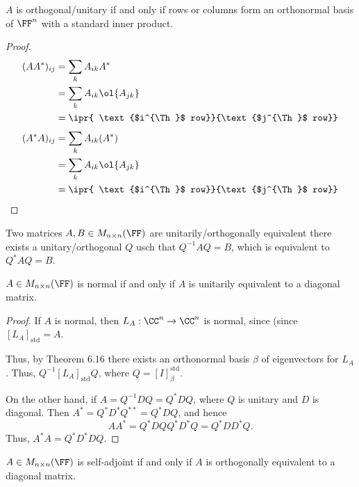 \documentclass[11pt]{scrartcl}
\begin{document}
  \begin{remark}
    $A$ is orthogonal/unitary if and only if rows or columns form an orthonormal basis of $\FF^n$ with a standard inner product.
  \end{remark}
  \begin{proof}
    \hfill

    \begin{align}
      (AA^{*})_{ij} & = \sum_k A_{ik}A^{*}        \\
                    & = \sum_{k} A_{ik}\ol{A_{jk}} \\
                    & = \ipr{ \text{$i^{\Th}$ row}}{\text{$j^{\Th}$ row}}
    \end{align}
    \begin{align}
      (A^* A)_{ij} & = \sum_kA_{ik}(A^{*})        \\
                    & = \sum_{k} A_{ik}\ol{A_{jk}} \\
                    & = \ipr{ \text{$i^{\Th}$ row}}{\text{$j^{\Th}$ row}}
    \end{align}
  \end{proof}
  \begin{definition}
    Two matrices $A, B \in M_{n\times n}(\FF)$ are unitarily/orthogonally equivalent there exists a unitary/orthogonal $Q$ usch that $Q^{-1}AQ = B$, which is equivalent to $Q^{*}AQ = B$.
  \end{definition}
  \begin{theorem}
    $A \in M_{n\times n}(\FF)$ is normal if and only if $A$ is unitarily equivalent to a diagonal matrix.
  \end{theorem}

  \begin{proof}
    \hfill

    If $A$ is normal, then $L_A:\CC^n\to\CC^n$ is normal, since (since $[L_A]_{\text{std}}=A$.

    Thus, by Theorem 6.16 there exists an orthonormal basis $\beta$ of eigenvectors for $L_{A}$. Thus, $Q^{-1}[L_A]_{\text{std}}Q$, where $Q=[I]_{\beta}^{\text{std}}$.

    On the other hand, if $A = Q^{-1}DQ=Q^{*}DQ$, where $Q$ is unitary and $D$ is diagonal. Then $A^{*}=Q^{*}D^{*}Q^{**}=Q^{*}DQ$, and hence \[AA^{*} = Q^{*}DQQ^{*}D^{*}Q = Q^{*}DD^{*}Q.\]
    Thus,  $A^{*}A = Q^{*}D^{*}DQ$.
  \end{proof}

  \begin{theorem}
    $A \in M_{n\times n}(\FF)$ is self-adjoint if and only if $A$ is orthogonally equivalent to a diagonal matrix.
  \end{theorem}
\end{document}
